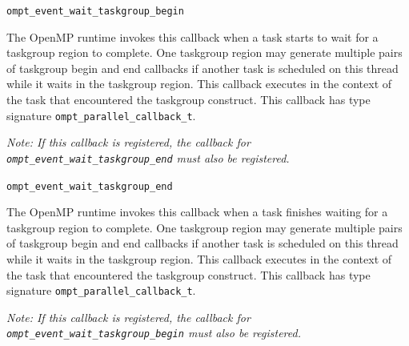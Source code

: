 \documentclass{article}
\newcommand{\descheader}[1]{{\needspace{3\baselineskip}\vspace{1em}\noindent \fbox{#1}}}
\begin{document}
\begin{description}

\item \verb|ompt_event_wait_taskgroup_begin|

  \sloppy
   The OpenMP runtime invokes this callback 
when a task starts to
   wait  for a taskgroup region to complete. One taskgroup region may generate multiple pairs of
taskgroup begin and end callbacks if another task is scheduled on this thread while it waits in the taskgroup region. This callback
   executes in the context of the task that encountered the taskgroup construct.  
   This callback has type signature \verb|ompt_parallel_callback_t|. 
   
   {\em Note: If this callback is
   registered, the callback for \verb|ompt_event_wait_taskgroup_end| must also
   be registered.}


\item \verb|ompt_event_wait_taskgroup_end|
  
   The OpenMP runtime invokes this callback 
when a task finishes
   waiting for a taskgroup region to complete. One taskgroup region may generate multiple
   pairs of taskgroup begin and end callbacks if another task is scheduled on this thread while it waits in the taskgroup region.   This
   callback executes in the context of the task that encountered the taskgroup construct. 
This callback has type signature \verb|ompt_parallel_callback_t|. 

{\em Note: If this
   callback is registered, the callback for
   \verb|ompt_event_wait_taskgroup_begin| must also be registered.}

\end{description}

\descheader{Lock Release}
\end{document}
